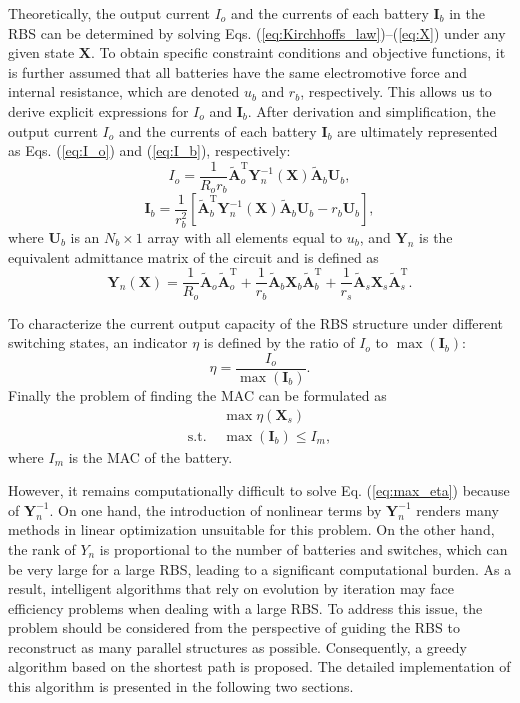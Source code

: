 \documentclass{article}
\def\T{\mathrm{T}}
\begin{document}
Theoretically, the output current $I_o$ and the currents of each battery $\bm{I}_b$ in the RBS  can be determined by solving Eqs. (\ref{eq:Kirchhoffs_law})--(\ref{eq:X}) under any given state $\bm{X}$.
To obtain specific constraint conditions and objective functions, it is further assumed that all batteries have the same electromotive force and internal resistance, which are denoted $u_b$ and $r_b$, respectively.
This allows us to derive explicit expressions for $I_o$ and $\bm{I}_b$.
After derivation and simplification, the output current $I_o$ and the currents of each battery $\bm{I}_b$ are ultimately represented as Eqs. (\ref{eq:I_o}) and (\ref{eq:I_b}), respectively:
\begin{equation}\label{eq:I_o}
    I_o = \frac{1}{R_o r_b} \bm{\tilde{A}}_o^\T \bm{Y}_n^{-1}(\bm{X}) \bm{\tilde{A}}_b \bm{U}_b,
\end{equation}
\begin{equation}\label{eq:I_b}
    \bm{I}_b = \frac{1}{r_b^2}[\bm{\tilde{A}}_b^\T \bm{Y}_n^{-1}(\bm{X}) \bm{\tilde{A}}_b\bm{U}_b -r_b \bm{U}_b],
\end{equation}
where $\bm{U}_b$ is an $N_b\times 1$ array with all elements equal to $u_b$,
and $\bm{Y}_n$ is the equivalent admittance matrix of the circuit and is defined as
\begin{equation}\label{eq:Yn}
    \bm{Y}_n (\bm{X}) = \frac{1}{R_o} \bm{\tilde{A}}_o\bm{\tilde{A}}_o^\T + \frac{1}{r_b} \bm{\tilde{A}}_b\bm{X}_b\bm{\tilde{A}}_b^\T + \frac{1}{r_s}\bm{\tilde{A}}_s\bm{X}_s\bm{\tilde{A}}_s^\T.
\end{equation}


To characterize the current output capacity of the RBS structure under different switching states, an indicator $\eta$ is defined by the ratio of $I_o$ to $\max (\bm{I}_b)$:
\begin{equation}\label{eq:eta}
    \eta = \frac{I_o}{\max (\bm{I}_b)}.
\end{equation}
Finally the problem of finding the MAC can be formulated as
\begin{align}
    & \max \eta(\bm{X}_s) \label{eq:max_eta}\\
    \text{s.t. } & \max (\bm{I}_b) \leq I_m, \label{eq:Ib_leq_Im}
\end{align}
where $I_m$ is the MAC of the battery.


However, it remains computationally difficult to solve Eq. (\ref{eq:max_eta}) because of $\bm{Y}_n^{-1}$.
On one hand,  the introduction of nonlinear terms by $\bm{Y}_n^{-1}$ renders many  methods in linear optimization unsuitable for this problem.
On the other hand, the rank of $Y_{n}$ is proportional to the number of batteries and switches, which can be very large for a large RBS, leading to a significant computational burden.
As a result, intelligent algorithms that rely on evolution by iteration may face efficiency problems when dealing with a large RBS.
To address this issue, the problem should be considered from the perspective of guiding the RBS to reconstruct as many parallel structures as possible.
Consequently, a greedy algorithm based on the shortest path is proposed. 
The detailed implementation of this algorithm is presented in the following two sections.
\end{document}
